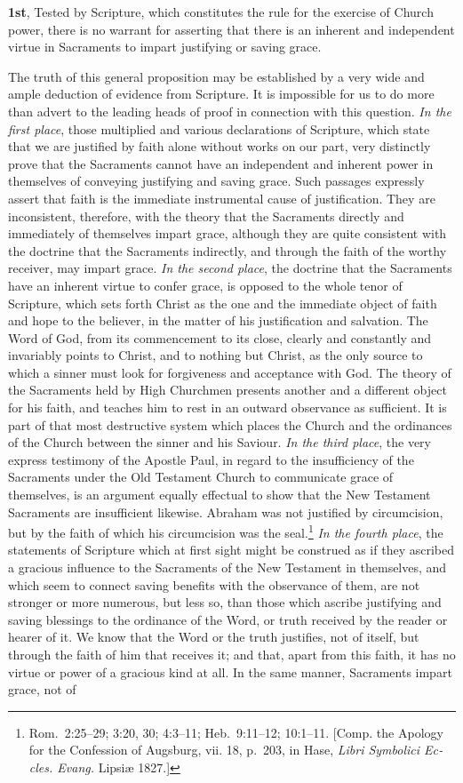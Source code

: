 \documentclass[
]{book}
\begin{document}
\textbf{1st}, Tested by Scripture, which constitutes the rule for the exercise of Church power, there is no warrant for asserting that there is an inherent and independent virtue in Sacraments to impart justifying or saving grace.

The truth of this general proposition may be established by a very wide and ample deduction of evidence from Scripture. It is impossible for us to do more than advert to the leading heads of proof in connection with this question. \emph{In the first place}, those multiplied and various declarations of Scripture, which state that we are justified by faith alone without works on our part, very distinctly prove that the Sacraments cannot have an independent and inherent power in themselves of conveying justifying and saving grace. Such passages expressly assert that faith is the immediate instrumental cause of justification. They are inconsistent, therefore, with the theory that the Sacraments directly and immediately of themselves impart grace, although they are quite consistent with the doctrine that the Sacraments indirectly, and through the faith of the worthy receiver, may impart grace. \emph{In the second place}, the doctrine that the Sacraments have an inherent virtue to confer grace, is opposed to the whole tenor of Scripture, which sets forth Christ as the one and the immediate object of faith and hope to the believer, in the matter of his justification and salvation. The Word of God, from its commencement to its close, clearly and constantly and invariably points to Christ, and to nothing but Christ, as the only source to which a sinner must look for forgiveness and acceptance with God. The theory of the Sacraments held by High Churchmen presents another and a different object for his faith, and teaches him to rest in an outward observance as sufficient. It is part of that most destructive system which places the Church and the ordinances of the Church between the sinner and his Saviour. \emph{In the third place}, the very express testimony of the Apostle Paul, in regard to the insufficiency of the Sacraments under the Old Testament Church to communicate grace of themselves, is an argument equally effectual to show that the New Testament Sacraments are insufficient likewise. Abraham was not justified by circumcision, but by the faith of which his circumcision was the seal.\footnote{Rom.~2:25--29; 3:20, 30; 4:3--11; Heb.~9:11--12; 10:1--11. {[}Comp. the Apology for the Confession of Augsburg, vii. 18, p.~203, in Hase, \foreignlanguage{latin}{\emph{Libri Symbolici Eccles. Evang.} Lipsiæ} 1827.{]}} \emph{In the fourth place}, the statements of Scripture which at first sight might be construed as if they ascribed a gracious influence to the Sacraments of the New Testament in themselves, and which seem to connect saving benefits with the observance of them, are not stronger or more numerous, but less so, than those which ascribe justifying and saving blessings to the ordinance of the Word, or truth received by the reader or hearer of it. We know that the Word or the truth justifies, not of itself, but through the faith of him that receives it; and that, apart from this faith, it has no virtue or power of a gracious kind at all. In the same manner, Sacraments impart grace, not of 
\end{document}

